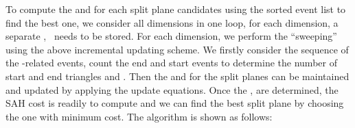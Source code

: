 To compute the \mynumtrileft and \mynumtriright for each split plane candidates  using the sorted event list to find the best one, we consider all dimensions in one loop, for each dimension, a separate , \ needs to be stored. For each dimension, we perform the ``sweeping'' using the above incremental updating scheme. We firstly consider the sequence of the -related events, count the end and start events to determine the number of start and end triangles  and . Then the \mynumtrileft and \mynumtriright for the split planes can be maintained and updated by applying the update equations. Once the \mynumtrileft, \mynumtriright are determined, the SAH cost is readily to compute and we can find the best split plane by choosing the one with minimum cost. The algorithm is shown as follows: 

